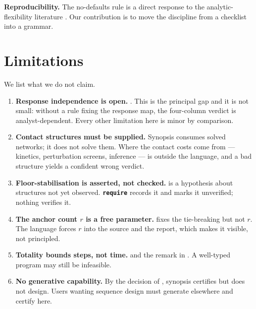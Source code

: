 \documentclass[11pt,twocolumn,a4paper]{article}
\theoremstyle{plain}
\theoremstyle{definition}
\theoremstyle{remark}
\newcommand{\kw}[1]{\texttt{\textbf{#1}}}
\begin{document}
\textbf{Reproducibility.} The no-defaults rule is a direct response to
the analytic-flexibility literature
\cite{simmons2011false,gelman2013garden,ioannidis2005why,baker2016reproducibility,sandve2013ten}.
Our contribution is to move the discipline from a checklist into a
grammar.

\section{Limitations}
\label{sec:limits}

We list what we do not claim.

\begin{enumerate}[label=\textbf{L\arabic*.},leftmargin=2.6em]
\item \textbf{Response independence is open.} . This is
      the principal gap and it is not small: without a rule fixing the
      response map, the four-column verdict is analyst-dependent. Every
      other limitation here is minor by comparison.

\item \textbf{Contact structures must be supplied.} Synopsis consumes
      solved networks; it does not solve them. Where the contact costs
      come from --- kinetics, perturbation screens, inference --- is
      outside the language, and a bad structure yields a confident
      wrong verdict.

\item \textbf{Floor-stabilisation is asserted, not checked.}
       is a hypothesis about structures not yet
      observed. \kw{require} records it and marks it unverified; nothing
      verifies it.

\item \textbf{The anchor count $r$ is a free parameter.} 
      fixes the tie-breaking but not $r$. The language forces $r$ into
      the source and the report, which makes it visible, not principled.

\item \textbf{Totality bounds steps, not time.}  and the
      remark in . A well-typed program may still be
      infeasible.

\item \textbf{No generative capability.} By the decision of
      , synopsis certifies but does not design.
      Users wanting sequence design must generate elsewhere and certify
      here.


\end{enumerate}
\end{document}
